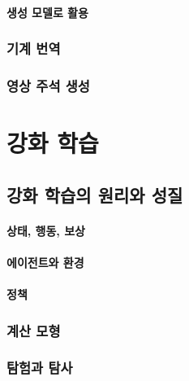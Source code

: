 \documentclass [12pt] {oblivoir}
\let\oldsubsubsection=\subsubsection
\renewcommand{\subsubsection}
{
  \filbreak
  \oldsubsubsection
}
\begin{document}
\vspace{3mm}

\paragraph*{생성 모델로 활용}\mbox{}

\vspace{3mm}

\subsubsection{기계 번역}

\subsubsection{영상 주석 생성}

\newpage
\section{강화 학습}

\subsection{강화 학습의 원리와 성질}

\paragraph*{상태, 행동, 보상}\mbox{}

\vspace{3mm}

\paragraph*{에이전트와 환경}\mbox{}

\vspace{3mm}

\paragraph*{정책}\mbox{}

\vspace{3mm}

\subsubsection{계산 모형}

\subsubsection{탐험과 탐사}
\end{document}
